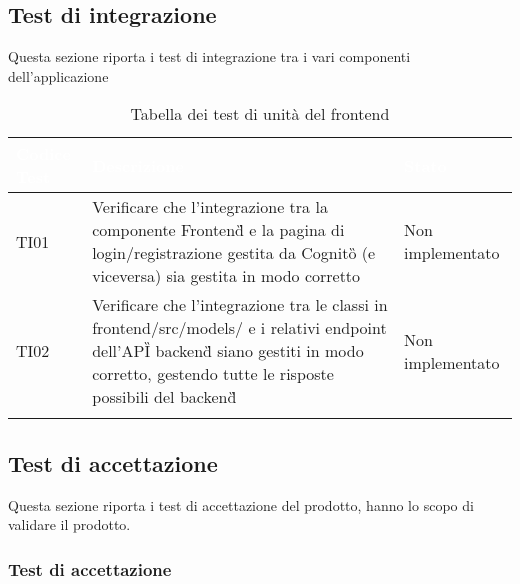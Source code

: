 \subsection{Test di integrazione}
    Questa sezione riporta i test di integrazione tra i vari componenti dell'applicazione

    {
        \setlength{\freewidth}{\dimexpr\textwidth-10\tabcolsep}
        \renewcommand{\arraystretch}{1.5}
        \centering
        \setlength{\aboverulesep}{0pt}
        \setlength{\belowrulesep}{0pt}
        \begin{longtable}{C{.3\freewidth} C{.5\freewidth} C{.3\freewidth}}
        \toprule
        \textcolor{white}{\textbf{Codice Test}}&
        \textcolor{white}{\textbf{Descrizione}}&
        \textcolor{white}{\textbf{Stato}}\\	
        \toprule
        \endhead

        TI01 & Verificare che l'integrazione tra la componente Frontend\G{} e la pagina di login/registrazione gestita da Cognito\G{} (e viceversa) 
            sia gestita in modo corretto & Non implementato \\

        TI02 & Verificare che l'integrazione tra le classi in frontend/src/models/ e i relativi endpoint dell'API\G{} backend\G{} siano
            gestiti in modo corretto, gestendo tutte le risposte possibili del backend\G{} & Non implementato \\

        \bottomrule
        \caption{Tabella dei test di unità del frontend}
        \end{longtable}
    }

\subsection{Test di accettazione}
Questa sezione  riporta i test di accettazione del prodotto, hanno lo scopo di validare il prodotto.

\subsubsection{Test di accettazione}

